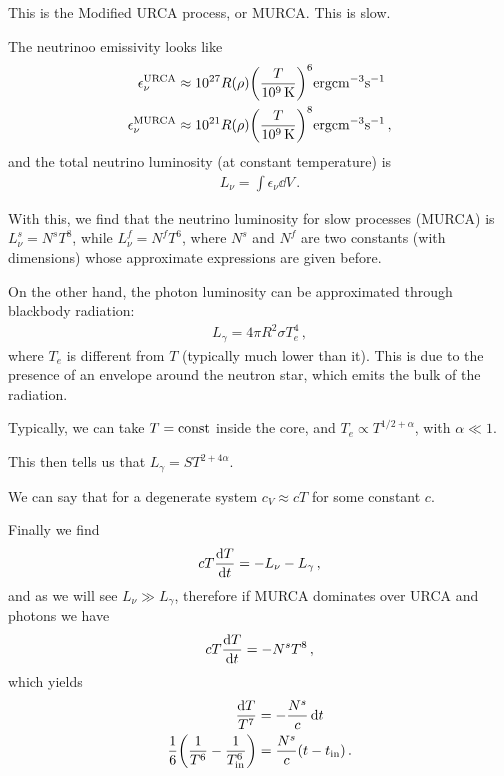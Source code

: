 \documentclass[main.tex]{subfiles}
\begin{document}
This is the Modified URCA process, or MURCA. This is slow. 

The neutrinoo emissivity looks like 
%
\begin{align}
\epsilon _\nu^{\text{URCA}} &\approx \num{e27} R(\rho ) \qty(\frac{T}{\SI{e9}{K}})^{6} \SI{}{erg cm^{-3} s^{-1}} \\
\epsilon _\nu^{\text{MURCA}} &\approx \num{e21} R(\rho ) \qty(\frac{T}{\SI{e9}{K}})^{8} \SI{}{erg cm^{-3} s^{-1}}
\,,
\end{align}
%
and the total neutrino luminosity (at constant temperature) is 
%
\begin{align}
L_\nu = \int \epsilon _\nu \dd{V}
\,.
\end{align}

With this, we find that the neutrino luminosity for slow processes (MURCA) is \(L_\nu^{s} = N^{s} T^{8}\), while \(L_\nu^{f} = N^{f} T^{6}\), where \(N^{s}\) and \(N^{f}\) are two constants (with dimensions) whose approximate expressions are given before. 

On the other hand, the photon luminosity can be approximated through blackbody radiation: 
%
\begin{align}
L_\gamma = 4 \pi R^2 \sigma T_e^4
\,,
\end{align}
%
where \(T_e\) is different from \(T\) (typically much lower than it). 
This is due to the presence of an envelope around the neutron star, which emits the bulk of the radiation. 

Typically, we can take \(T = \text{const}\) inside the core, and \(T_e \propto T^{1/2 + \alpha }\), with \(\alpha \ll 1\). 

This then tells us that \(L_\gamma = S T^{2 + 4 \alpha }\). 

We can say that for a degenerate system \(c_V \approx c T\) for some constant \(c\). 

Finally we find 
%
\begin{align}
c T \dv{T}{t} = - L_\nu - L_\gamma 
\,,
\end{align}
%
and as we will see \(L_\nu \gg  L_\gamma \), therefore if MURCA dominates over URCA and photons we have 
%
\begin{align}
cT \dv{T}{t} = - N^{s} T^{8}
\,,
\end{align}
%
which yields 
%
\begin{align}
\frac{ \dd{T}}{T^{7}} &= - \frac{N^{s}}{c} \dd{t}  \\
\frac{1}{6} \qty( \frac{1}{T^{6}} - \frac{1}{T _{\text{in}}^{6}}) &= \frac{N^{s}}{c} (t - t _{\text{in}})
\,.
\end{align}
\end{document}
